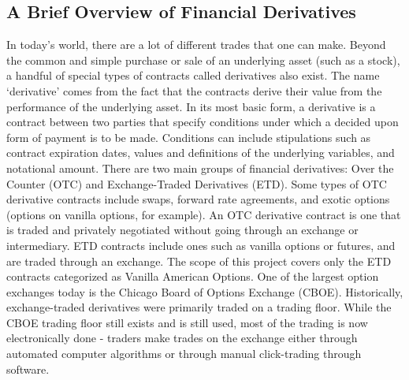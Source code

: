 \documentclass[12pt, a4paper, notitlepage]{article}
\numberwithin{equation}{subsection}
\numberwithin{figure}{subsection}
\numberwithin{table}{subsection}
\newcommand{\newpar}{\newline \newline}
\begin{document}
\subsection{A Brief Overview of Financial Derivatives}
In today's world, there are a lot of different trades that one can make.  Beyond the common and simple purchase or sale of an underlying asset (such as a stock), a handful of special types of contracts called derivatives also exist.  The name `derivative' comes from the fact that the contracts derive their value from the performance of the underlying asset.  In its most basic form, a derivative is a contract between two parties that specify conditions under which a decided upon form of payment is to be made.  Conditions can include stipulations such as contract expiration dates, values and definitions of the underlying variables, and notational amount.
\newpar
There are two main groups of financial derivatives: Over the Counter (OTC) and Exchange-Traded Derivatives (ETD).  Some types of OTC derivative contracts include swaps, forward rate agreements, and exotic options (options on vanilla options, for example).  An OTC derivative contract is one that is traded and privately negotiated without going through an exchange or intermediary.  ETD contracts include ones such as vanilla options or futures, and are traded through an exchange.  The scope of this project covers only the ETD contracts categorized as Vanilla American Options.
\newpar
One of the largest option exchanges today is the Chicago Board of Options Exchange (CBOE).  Historically, exchange-traded derivatives were primarily traded on a trading floor.  While the CBOE trading floor still exists and is still used, most of the trading is now electronically done - traders make trades on the exchange either through automated computer algorithms or through manual click-trading through software.
\end{document}
